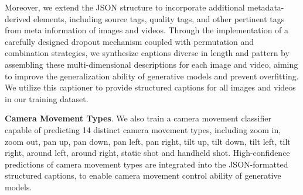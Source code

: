 Moreover, we extend the JSON structure to  incorporate additional metadata-derived elements, including source tags, quality tags, and other pertinent tags from meta information of images and videos. Through the implementation of a carefully designed dropout mechanism coupled with permutation and combination strategies, we synthesize captions diverse in length and pattern by assembling these multi-dimensional descriptions for each image and video, aiming to improve the generalization ability of generative models and prevent overfitting. We utilize this captioner to provide structured captions for all images and videos in our training dataset.

\textbf{Camera Movement Types}. We also train a camera movement classifier capable of predicting 14 distinct camera movement types, including zoom in, zoom out, pan up, pan down, pan left, pan right, tilt up, tilt down, tilt left, tilt right, around left, around right, static shot and handheld shot. High-confidence predictions of camera movement types are integrated into the JSON-formatted structured captions, to enable camera movement control ability of generative models.



